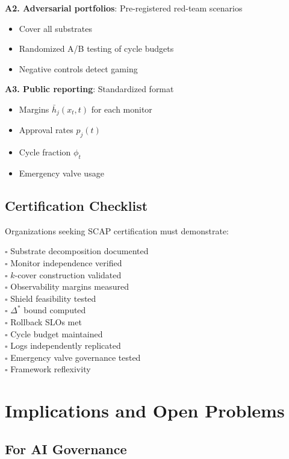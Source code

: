 \documentclass[11pt,a4paper]{article}
\theoremstyle{definition}
\begin{document}
\textbf{A2. Adversarial portfolios}: Pre-registered red-team scenarios
\begin{itemize}
\item Cover all substrates
\item Randomized A/B testing of cycle budgets
\item Negative controls detect gaming
\end{itemize}

\textbf{A3. Public reporting}: Standardized format
\begin{itemize}
\item Margins $\bar{h}_j(x_t, t)$ for each monitor
\item Approval rates $p_j(t)$
\item Cycle fraction $\phi_t$
\item Emergency valve usage
\end{itemize}

\subsection{Certification Checklist}

Organizations seeking SCAP certification must demonstrate:

$\square$ Substrate decomposition documented\\
$\square$ Monitor independence verified\\
$\square$ $k$-cover construction validated\\
$\square$ Observability margins measured\\
$\square$ Shield feasibility tested\\
$\square$ $\Delta^*$ bound computed\\
$\square$ Rollback SLOs met\\
$\square$ Cycle budget maintained\\
$\square$ Logs independently replicated\\
$\square$ Emergency valve governance tested\\
$\square$ Framework reflexivity

\section{Implications and Open Problems}

\subsection{For AI Governance}
\end{document}
